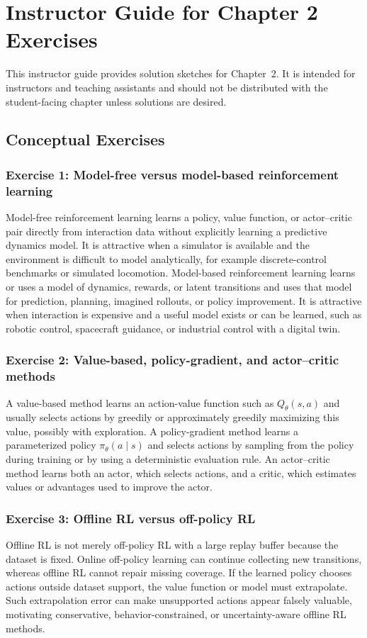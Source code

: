 \chapter*{Instructor Guide for Chapter 2 Exercises}

This instructor guide provides solution sketches for Chapter~2. It is intended for instructors and teaching assistants and should not be distributed with the student-facing chapter unless solutions are desired.

\section*{Conceptual Exercises}

\subsection*{Exercise 1: Model-free versus model-based reinforcement learning}
Model-free reinforcement learning learns a policy, value function, or actor--critic pair directly from interaction data without explicitly learning a predictive dynamics model. It is attractive when a simulator is available and the environment is difficult to model analytically, for example discrete-control benchmarks or simulated locomotion. Model-based reinforcement learning learns or uses a model of dynamics, rewards, or latent transitions and uses that model for prediction, planning, imagined rollouts, or policy improvement. It is attractive when interaction is expensive and a useful model exists or can be learned, such as robotic control, spacecraft guidance, or industrial control with a digital twin.

\subsection*{Exercise 2: Value-based, policy-gradient, and actor--critic methods}
A value-based method learns an action-value function such as $Q_\theta(s,a)$ and usually selects actions by greedily or approximately greedily maximizing this value, possibly with exploration. A policy-gradient method learns a parameterized policy $\pi_\theta(a\mid s)$ and selects actions by sampling from the policy during training or by using a deterministic evaluation rule. An actor--critic method learns both an actor, which selects actions, and a critic, which estimates values or advantages used to improve the actor.

\subsection*{Exercise 3: Offline RL versus off-policy RL}
Offline RL is not merely off-policy RL with a large replay buffer because the dataset is fixed. Online off-policy learning can continue collecting new transitions, whereas offline RL cannot repair missing coverage. If the learned policy chooses actions outside dataset support, the value function or model must extrapolate. Such extrapolation error can make unsupported actions appear falsely valuable, motivating conservative, behavior-constrained, or uncertainty-aware offline RL methods.

